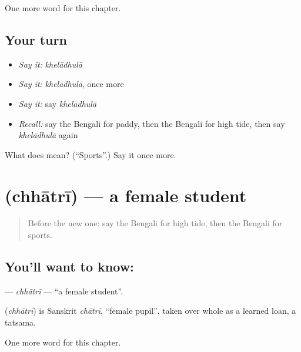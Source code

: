 \begin{grammarlens}[title={What you've built}]
One more word for this chapter.
\end{grammarlens}

\subsection*{Your turn}
\begin{itemize}
\raggedright
  \item \emph{Say it:} \emph{khelādhulā}
  \item \emph{Say it:} \emph{khelādhulā}, once more
  \item \emph{Say it:} say \emph{khelādhulā}
  \item \emph{Recall:} say the Bengali for paddy, then the Bengali for high tide, then say \emph{khelādhulā} again
\end{itemize}

\begin{tcolorbox}[breakable,colback=teal!4,colframe=teal!35!black,title={Before you move on}]
What does  mean? (\textquotedblleft{}Sports\textquotedblright{}.) Say it once more.
\end{tcolorbox}
\section[\texorpdfstring{\bn{ছাত্রী} (chhātrī)}{ছাত্রী (chhātrī)}]{ (chhātrī) — a female student}

\label{lesson:BN-C172-chhatri}



\begin{quote}
Before the new one: say the Bengali for high tide, then the Bengali for sports.
\end{quote}

\subsection*{You'll want to know: }
\textbf{} — \emph{chhātrī} — \textquotedblleft{}a female student\textquotedblright{}.

\begin{cousinweb}
\textbf{} (\emph{chhātrī}) is Sanskrit \emph{chātrī}, \textquotedblleft{}female pupil\textquotedblright{}, taken over whole as a learned loan, a tatsama.
\end{cousinweb}

\begin{grammarlens}[title={What you've built}]
One more word for this chapter.
\end{grammarlens}


